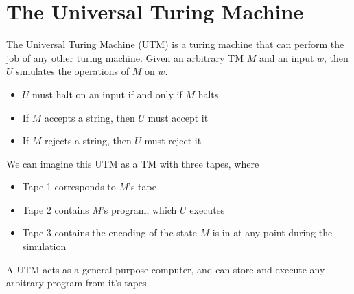 \section*{The Universal Turing Machine}

The Universal Turing Machine (UTM) is a turing machine that can perform the job of any other turing machine. Given an
 arbitrary TM $M$ and an input $w$, then $U$ simulates the operations of $M$ on $w$.
\begin{itemize}
  \item $U$ must halt on an input if and only if $M$ halts
  \item If $M$ accepts a string, then $U$ must accept it
  \item If $M$ rejects a string, then $U$ must reject it
\end{itemize}

We can imagine this UTM as a TM with three tapes, where
\begin{itemize}
  \item Tape 1 corresponds to $M$'s tape
  \item Tape 2 contains $M$'s program, which $U$ executes
  \item Tape 3 contains the encoding of the state $M$ is in at any point during the simulation
\end{itemize}

A UTM acts as a general-purpose computer, and can store and execute any arbitrary program from it's tapes.